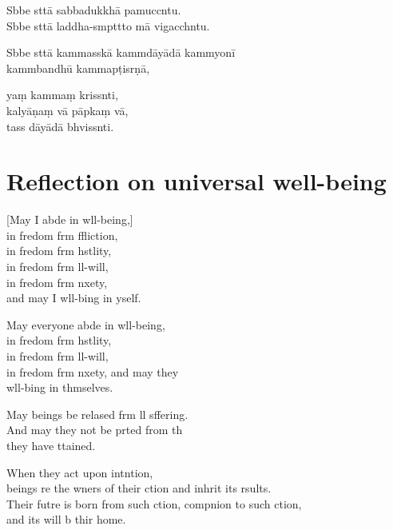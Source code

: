 Sbbe sttā sabbadukkhā pamuccntu.\\
Sbbe sttā laddha-smpttto mā vigacchntu.

Sbbe sttā kammasskā kammdāyādā kammyonī\\
\vin kammbandhū kammapṭisrṇā,

yaṃ kammaṃ krissnti,\\
kalyāṇaṃ vā pāpkaṃ vā,\\
tass dāyādā bhvissnti.

\clearpage

\chapter[Universal well-being]{Reflection on universal well-being}                       %

\begin{leader}
\end{leader}

[May I abde in wll-being,]\\
in fredom frm ffliction,\\
in fredom frm hstlity,\\
in fredom frm ll-will,\\
in fredom frm nxety,\\
and may I  wll-bing in yself.

May everyone abde in wll-being,\\
in fredom frm hstlity,\\
in fredom frm ll-will,\\
in fredom frm nxety, and may they\\
 wll-bing in thmselves.

May  beings be relased frm ll sffering.\\
And may they not be prted from th\\
 they have ttained.

When they act upon intntion,\\
 beings re the wners of their ction and inhrit its rsults.\\
Their futre is born from such ction, compnion to such ction,\\
and its  will b thir home.

